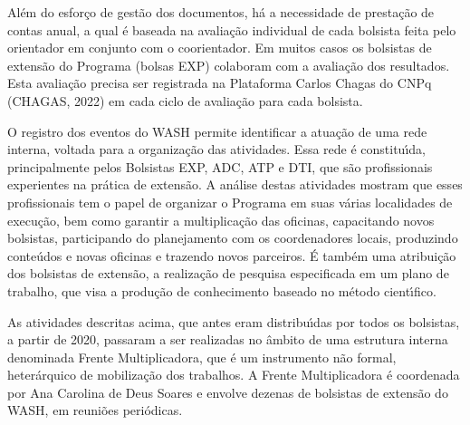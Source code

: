 \documentclass[
12pt,		%
openright,	%
twoside,  %
a4paper,			%
chapter=TITLE,		%
english,			%
french,				%
spanish,			%
brazil				%
]{USPSC-classe/USPSC}
\begin{document}
Al\'em do esfor\c{c}o de gest\~ao dos documentos, h\'a a necessidade de presta\c{c}\~ao de contas anual, a qual \'e baseada na avalia\c{c}\~ao individual de cada bolsista feita pelo orientador em conjunto com o coorientador. Em muitos casos os bolsistas de extens\~ao do Programa (bolsas EXP) colaboram com a avalia\c{c}\~ao dos resultados. Esta avalia\c{c}\~ao precisa ser registrada na Plataforma Carlos Chagas do CNPq (CHAGAS, 2022) em cada ciclo de avalia\c{c}\~ao para cada bolsista.

















O registro dos eventos do WASH permite identificar a atua\c{c}\~ao de uma rede interna, voltada para a organiza\c{c}\~ao das atividades. Essa rede \'e constitu\'{\i}da, principalmente pelos  Bolsistas EXP, ADC, ATP e DTI, que s\~ao profissionais experientes na pr\'atica de extens\~ao. A an\'alise destas atividades mostram que esses profissionais tem o papel de organizar o Programa em suas v\'arias localidades de execu\c{c}\~ao, bem como garantir a multiplica\c{c}\~ao das oficinas, capacitando novos bolsistas, participando do planejamento com os coordenadores locais, produzindo conte\'udos e novas oficinas e trazendo novos parceiros. \'E tamb\'em uma atribui\c{c}\~ao dos bolsistas de extens\~ao, a realiza\c{c}\~ao de pesquisa especificada em um plano de trabalho, que visa a produ\c{c}\~ao de conhecimento baseado no m\'etodo cient\'{\i}fico.

















As atividades descritas acima, que antes eram distribu\'{\i}das por todos os bolsistas, a partir de 2020, passaram a ser realizadas no \^ambito de uma estrutura interna denominada \textquotedbl Frente Multiplicadora\textquotedbl , que \'e um instrumento n\~ao formal, heter\'arquico de mobiliza\c{c}\~ao dos trabalhos. A Frente Multiplicadora \'e coordenada por Ana Carolina de Deus Soares e envolve dezenas de bolsistas de extens\~ao do WASH, em reuni\~oes peri\'odicas.
\end{document}
